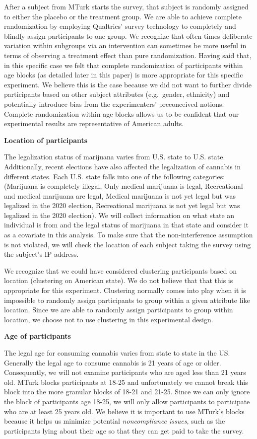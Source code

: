 \documentclass[
]{article}
\begin{document}
After a subject from MTurk starts the survey, that subject is randomly
assigned to either the placebo or the treatment group. We are able to
achieve complete randomization by employing Qualtrics' survey technology
to completely and blindly assign participants to one group. We recognize
that often times deliberate variation within subgroups via an
intervention can sometimes be more useful in terms of observing a
treatment effect than pure randomization. Having said that, in this
specific case we felt that complete randomization of participants within
age blocks (as detailed later in this paper) is more appropriate for
this specific experiment. We believe this is the case because we did not
want to further divide participants based on other subject attributes
(e.g.~gender, ethnicity) and potentially introduce bias from the
experimenters' preconceived notions. Complete randomization within age
blocks allows us to be confident that our experimental results are
representative of American adults.

\textbf{Location of participants}

The legalization status of marijuana varies from U.S. state to U.S.
state. Additionally, recent elections have also affected the
legalization of cannabis in different states. Each U.S. state falls into
one of the following categories: (Marijuana is completely illegal, Only
medical marijuana is legal, Recreational and medical marijuana are
legal, Medical marijuana is not yet legal but was legalized in the 2020
election, Recreational marijuana is not yet legal but was legalized in
the 2020 election). We will collect information on what state an
individual is from and the legal status of marijuana in that state and
consider it as a covariate in this analysis. To make sure that the
non-interference assumption is not violated, we will check the location
of each subject taking the survey using the subject's IP address.

We recognize that we could have considered clustering participants based
on location (clustering on American state). We do not believe that that
this is appropriate for this experiment. Clustering normally comes into
play when it is impossible to randomly assign participants to group
within a given attribute like location. Since we are able to randomly
assign participants to group within location, we choose not to use
clustering in this experimental design.

\textbf{Age of participants}

The legal age for consuming cannabis varies from state to state in the
US. Generally the legal age to consume cannabis is 21 years of age or
older. Consequently, we will not examine participants who are aged less
than 21 years old. MTurk blocks participants at 18-25 and unfortunately
we cannot break this block into the more granular blocks of 18-21 and
21-25. Since we can only ignore the block of participants age 18-25, we
will only allow participants to participate who are at least 25 years
old. We believe it is important to use MTurk's blocks because it helps
us minimize potential \emph{noncompliance issues}, such as the
participants lying about their age so that they can get paid to take the
survey.
\end{document}
